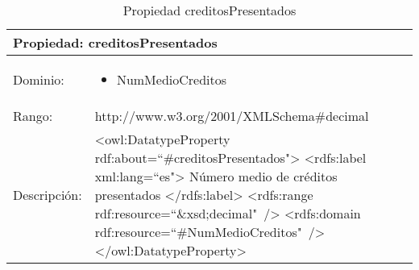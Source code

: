 \begin{table}[!ht]
	\centering
	\begin{tabular}{|p{}|p{}|}
		\hline
		\multicolumn{2}{|l|}{Propiedad: \textbf{creditosPresentados}}
		\\ \hline
		Dominio:&
		\begin{itemize}
			\item NumMedioCreditos
		\end{itemize}
		\\ \hline
		Rango:&
		http://www.w3.org/2001/XMLSchema\#decimal
		\\ \hline
		Descripción:&
		\textless owl:DatatypeProperty rdf:about=``\#creditosPresentados"\textgreater\newline 
		\tab\textless rdfs:label xml:lang=``es"\textgreater\newline
		\tab\tab Número medio de créditos presentados\newline
		\tab\textless /rdfs:label\textgreater\newline
		\tab\textless rdfs:range\newline
		\tab\tab rdf:resource=``\&xsd;decimal"\ /\textgreater\newline
		\tab\textless rdfs:domain\newline
		\tab\tab rdf:resource=``\#NumMedioCreditos"\ /\textgreater\newline
		\textless /owl:DatatypeProperty\textgreater
		\\ \hline
	\end{tabular}
	\caption{Propiedad creditosPresentados}
	\label{propiedad-creditospresentados}
\end{table}

